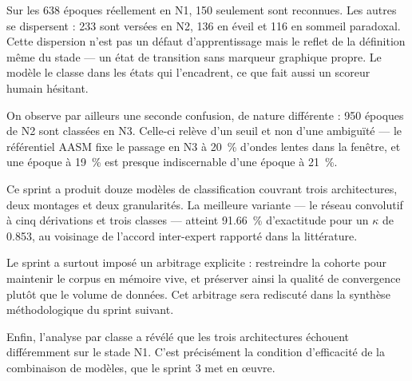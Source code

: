 Sur les \num{638} époques réellement en N1, \num{150} seulement sont reconnues. Les
autres se dispersent : \num{233} sont versées en N2, \num{136} en éveil et \num{116} en
sommeil paradoxal. Cette dispersion n'est pas un défaut d'apprentissage mais le reflet de
la définition même du stade --- un état de transition sans marqueur graphique propre. Le
modèle le classe dans les états qui l'encadrent, ce que fait aussi un scoreur humain
hésitant.

On observe par ailleurs une seconde confusion, de nature différente : \num{950} époques
de N2 sont classées en N3. Celle-ci relève d'un seuil et non d'une ambiguïté --- le
référentiel AASM fixe le passage en N3 à \SI{20}{\percent} d'ondes lentes dans la
fenêtre, et une époque à \SI{19}{\percent} est presque indiscernable d'une époque à
\SI{21}{\percent}.


Ce sprint a produit douze modèles de classification couvrant trois architectures, deux
montages et deux granularités. La meilleure variante --- le réseau convolutif à cinq
dérivations et trois classes --- atteint \SI{91,66}{\percent} d'exactitude pour un
$\kappa$ de \num{0,853}, au voisinage de l'accord inter-expert rapporté dans la
littérature.

Le sprint a surtout imposé un arbitrage explicite : restreindre la cohorte pour maintenir
le corpus en mémoire vive, et préserver ainsi la qualité de convergence plutôt que le
volume de données. Cet arbitrage sera rediscuté dans la synthèse méthodologique du sprint
suivant.

Enfin, l'analyse par classe a révélé que les trois architectures échouent différemment sur
le stade N1. C'est précisément la condition d'efficacité de la combinaison de modèles, que
le sprint 3 met en œuvre.
